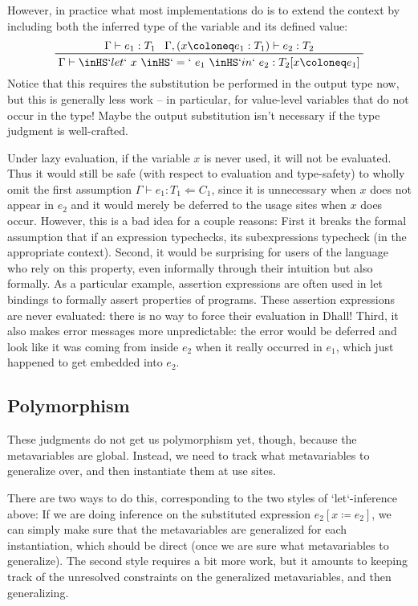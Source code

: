 \documentclass[11pt, twoside, reqno]{book}
\begin{document}
However, in practice what most implementations do is to extend the context by including both the inferred type of the variable and its defined value:
\begin{displaymath}
\prftree{\Gamma \vdash e_1 : T_1}{\Gamma, (x \coloneq e_1 : T_1) \vdash e_2 : T_2}{\Gamma \vdash \inHS`let`\ x\ \inHS`=`\ e_1\ \inHS`in`\ e_2 : T_2[x \coloneq e_1]}
\end{displaymath}
Notice that this requires the substitution be performed in the output type now, but this is generally less work -- in particular, for value-level variables that do not occur in the type!
Maybe the output substitution isn't necessary if the type judgment is well-crafted.

\begin{mdframed}[style=Note]
Under lazy evaluation, if the variable \(x\) is never used, it will not be evaluated.
Thus it would still be safe (with respect to evaluation and type-safety) to wholly omit the first assumption \(\Gamma \vdash e_1 : T_1 \Leftarrow C_1\), since it is unnecessary when \(x\) does not appear in \(e_2\) and it would merely be deferred to the usage sites when \(x\) does occur.
However, this is a bad idea for a couple reasons:
First it breaks the formal assumption that if an expression typechecks, its subexpressions typecheck (in the appropriate context).
Second, it would be surprising for users of the language who rely on this property, even informally through their intuition but also formally.
As a particular example, assertion expressions are often used in let bindings to formally assert properties of programs.
These assertion expressions are never evaluated: there is no way to force their evaluation in Dhall!
Third, it also makes error messages more unpredictable: the error would be deferred and look like it was coming from inside \(e_2\) when it really occurred in \(e_1\), which just happened to get embedded into \(e_2\).
\end{mdframed}


\subsection{Polymorphism}
These judgments do not get us polymorphism yet, though, because the metavariables are global.
Instead, we need to track what metavariables to generalize over, and then instantiate them at use sites.

There are two ways to do this, corresponding to the two styles of \inHS`let`-inference above:
If we are doing inference on the substituted expression \(e_2[x \coloneq e_2]\), we can simply make sure that the metavariables are generalized for each instantiation, which should be direct (once we are sure what metavariables to generalize).
The second style requires a bit more work, but it amounts to keeping track of the unresolved constraints on the generalized metavariables, and then generalizing.
\end{document}
